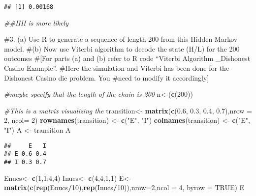 \documentclass[
]{article}
\newenvironment{Shaded}{\begin{snugshade}}{\end{snugshade}}
\newcommand{\CommentTok}[1]{\textcolor[rgb]{0.56,0.35,0.01}{\textit{#1}}}
\newcommand{\DataTypeTok}[1]{\textcolor[rgb]{0.13,0.29,0.53}{#1}}
\newcommand{\DecValTok}[1]{\textcolor[rgb]{0.00,0.00,0.81}{#1}}
\newcommand{\FloatTok}[1]{\textcolor[rgb]{0.00,0.00,0.81}{#1}}
\newcommand{\KeywordTok}[1]{\textcolor[rgb]{0.13,0.29,0.53}{\textbf{#1}}}
\newcommand{\NormalTok}[1]{#1}
\newcommand{\OperatorTok}[1]{\textcolor[rgb]{0.81,0.36,0.00}{\textbf{#1}}}
\newcommand{\OtherTok}[1]{\textcolor[rgb]{0.56,0.35,0.01}{#1}}
\newcommand{\StringTok}[1]{\textcolor[rgb]{0.31,0.60,0.02}{#1}}
\begin{document}
\begin{verbatim}
## [1] 0.00168
\end{verbatim}

\begin{Shaded}
\begin{Highlighting}[]
\CommentTok{##IIII is more likely}
\end{Highlighting}
\end{Shaded}

\#3. (a) Use R to generate a sequence of length 200 from this Hidden
Markov model. \#(b) Now use Viterbi algorithm to decode the state (H/L)
for the 200 outcomes \#{[}For parts (a) and (b) refer to R code
``Viterbi Algorithm \_Dishonest Casino Example''. \#Here the simulation
and Viterbi has been done for the Dishonest Casino die problem. You
\#need to modify it accordingly{]}

\begin{Shaded}
\begin{Highlighting}[]
\CommentTok{#maybe specify that the length of the chain is 200}
\NormalTok{n<-(}\KeywordTok{c}\NormalTok{(}\DecValTok{200}\NormalTok{))}


\CommentTok{#This is a matrix  visualizing the }
\NormalTok{transition<-}\StringTok{ }\KeywordTok{matrix}\NormalTok{(}\KeywordTok{c}\NormalTok{(}\FloatTok{0.6}\NormalTok{, }\FloatTok{0.3}\NormalTok{, }\FloatTok{0.4}\NormalTok{, }\FloatTok{0.7}\NormalTok{),}\DataTypeTok{nrow =} \DecValTok{2}\NormalTok{, }\DataTypeTok{ncol=} \DecValTok{2}\NormalTok{)}
\KeywordTok{rownames}\NormalTok{(transition) <-}\StringTok{ }\KeywordTok{c}\NormalTok{(}\StringTok{"E"}\NormalTok{, }\StringTok{"I"}\NormalTok{)}
\KeywordTok{colnames}\NormalTok{(transition) <-}\StringTok{ }\KeywordTok{c}\NormalTok{(}\StringTok{"E"}\NormalTok{, }\StringTok{"I"}\NormalTok{)}
\NormalTok{A <-}\StringTok{ }\NormalTok{transition}
\NormalTok{A}
\end{Highlighting}
\end{Shaded}

\begin{verbatim}
##     E   I
## E 0.6 0.4
## I 0.3 0.7
\end{verbatim}

\begin{Shaded}
\begin{Highlighting}[]
\NormalTok{Enucs<-}\StringTok{ }\KeywordTok{c}\NormalTok{(}\DecValTok{1}\NormalTok{,}\DecValTok{1}\NormalTok{,}\DecValTok{4}\NormalTok{,}\DecValTok{4}\NormalTok{)}
\NormalTok{Inucs<-}\StringTok{ }\KeywordTok{c}\NormalTok{(}\DecValTok{4}\NormalTok{,}\DecValTok{4}\NormalTok{,}\DecValTok{1}\NormalTok{,}\DecValTok{1}\NormalTok{)}
\NormalTok{E<-}\KeywordTok{matrix}\NormalTok{(}\KeywordTok{c}\NormalTok{(}\KeywordTok{rep}\NormalTok{(Enucs}\OperatorTok{/}\DecValTok{10}\NormalTok{),}\KeywordTok{rep}\NormalTok{(Inucs}\OperatorTok{/}\DecValTok{10}\NormalTok{)),}\DataTypeTok{nrow=}\DecValTok{2}\NormalTok{,}\DataTypeTok{ncol =} \DecValTok{4}\NormalTok{, }\DataTypeTok{byrow =} \OtherTok{TRUE}\NormalTok{)}
\NormalTok{E}
\end{Highlighting}
\end{Shaded}
\end{document}
